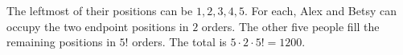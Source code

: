 The leftmost of their positions can be $1,2,3,4,5$. For each, Alex and Betsy can occupy the two endpoint positions in $2$ orders. The other five people fill the remaining positions in $5!$ orders. The total is $5\cdot2\cdot5!=\boxed{1200}$.
